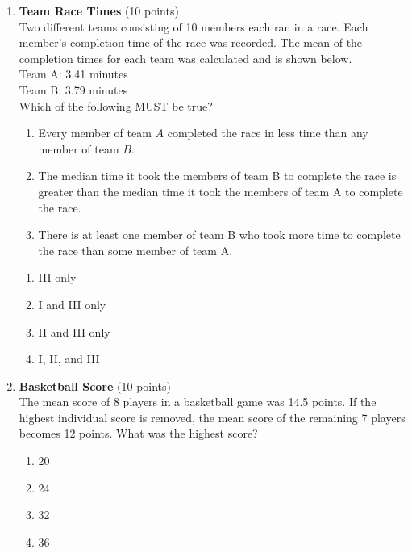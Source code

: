 \begin{enumerate}
  \item \textbf{Team Race Times} (10 points)\\
  Two different teams consisting of 10 members each ran in a race. Each member's completion time of the race was recorded. The mean of the completion times for each team was calculated and is shown below.\\
  Team A: 3.41 minutes\\
  Team B: 3.79 minutes\\
  Which of the following MUST be true?
  \begin{enumerate}[label=(\Alph*)]
    \item Every member of team $A$ completed the race in less time than any member of team $B$.
    \item The median time it took the members of team B to complete the race is greater than the median time it took the members of team A to complete the race.
    \item There is at least one member of team B who took more time to complete the race than some member of team A.
  \end{enumerate}
  \begin{enumerate}[label=(\Alph*)]
    \item III only
    \item I and III only
    \item II and III only
    \item I, II, and III
  \end{enumerate}
  \begin{subanswer}
  \end{subanswer}

  \newpage

  \item \textbf{Basketball Score} (10 points)\\
  The mean score of 8 players in a basketball game was 14.5 points. If the highest individual score is removed, the mean score of the remaining 7 players becomes 12 points. What was the highest score?
  \begin{enumerate}[label=(\Alph*)]
    \item 20
    \item 24
    \item 32
    \item 36
  \end{enumerate}
  \begin{subanswer}
  \end{subanswer}


\end{enumerate}
